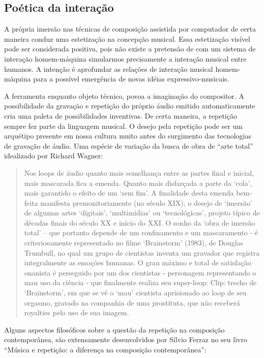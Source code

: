 \documentclass{ppgmus}
\begin{document}
\subsection{Poética da interação}


A própria imersão nas técnicas de composição assistida por computador de certa
maneira conduz uma estetização na concepção musical. Essa estetização visível
pode ser considerada positiva, pois não existe a pretensão de com um sistema 
de interação homem-máquina simularmos precisamente a interação musical entre
humanos. A intenção é aprofundar as relações de interação musical homem-máquina
para a possível emergência de novas idéias expressivo-musicais. 

A ferramenta enquanto objeto técnico, povoa a imaginação do compositor. A possibilidade
da gravação e repetição do próprio áudio emitido automaticamente cria uma paleta de
possibilidades inventivas. De certa maneira, a repetição sempre fez parte da linguagem
musical. O desejo pela repetição pode ser um arquétipo presente em nossa cultura
muito antes do surgimento das tecnologias de gravação de áudio. Uma espécie
de variação da busca de obra de ``arte total'' idealizado por Richard Wagner\cite{caesarloop}: 


\begin{quotation}
 Nos loops de áudio quanto mais semelhança entre as partes final e inicial, mais mascarada fica a
emenda. Quanto mais disfarçada a parte da ‘cola’, mais garantido o efeito de um ‘sem fim’. A finalidade
desta emenda bem-feita manifesta premonitoriamente (no século XIX), o desejo de ‘imersão’ de algumas
artes ‘digitais’, ‘multimídias’ ou ‘tecnológicas’, projeto típico de décadas finais do século XX e início do
XXI. O sonho da ‘obra de imersão total’ – que portanto depende de um confinamento e um mascaramento -
é criteriosamente representado no filme ‘Brainstorm’ (1983), de Douglas Trumbull, no qual um grupo de
cientistas inventa um gravador que registra integralmente as emoções humanas. O grau máximo e total de
satisfação onanista é perseguido por um dos cientistas - personagem representando o mau uso da ciência -
que finalmente realiza seu super-loop:
Clip: trecho de ‘Brainstorm’, em que se vê o ‘mau’ cientista aprisionado ao loop de seu orgasmo, gravado na
companhia de uma prostituta, que não receberá royalties pelo uso de sua imagem.
\end{quotation} 

Alguns aspectos filosóficos sobre a questão da repetição na composição contemporânea,
são extensamente desenvolvidos por Sílvio Ferraz no seu livro 
``Música e repetição: a diferença na composição contemporânea''\cite{ferraz1998musica}:
 
\end{document}
